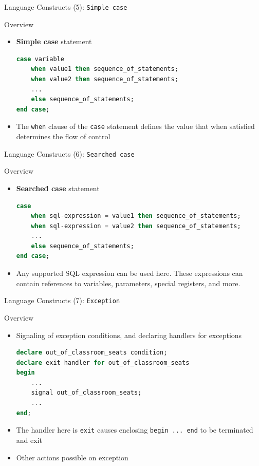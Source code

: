 \documentclass[aspectratio=169, xcolor=dvipsnames]{beamer}
\begin{document}
\begin{frame}[fragile]{Language Constructs (5): \texttt{Simple case}}
    \begin{block}{Overview}
        \begin{itemize}[<+->]
            \item \textbf{Simple case} statement
            \begin{lstlisting}[language=SQL]
case variable
    when value1 then sequence_of_statements; 
    when value2 then sequence_of_statements;
    ...
    else sequence_of_statements;
end case;
            \end{lstlisting}
            \item The \texttt{when} clause of the \texttt{case} statement defines the value that when satisfied determines the flow of control
        \end{itemize}
    \end{block}
\end{frame}

\begin{frame}[fragile]{Language Constructs (6): \texttt{Searched case}}
    \begin{block}{Overview}
        \begin{itemize}[<+->]
            \item \textbf{Searched case} statement
            \begin{lstlisting}[language=SQL]
case 
    when sql-expression = value1 then sequence_of_statements; 
    when sql-expression = value2 then sequence_of_statements;
    ...
    else sequence_of_statements;
end case;
            \end{lstlisting}
            \item Any supported SQL expression can be used here. These expressions can contain references to variables, parameters, special registers, and more.
        \end{itemize}
    \end{block}
\end{frame}

\begin{frame}[fragile]{Language Constructs (7): \texttt{Exception}}
    \begin{block}{Overview}
        \begin{itemize}[<+->]
            \item Signaling of exception conditions, and declaring handlers for exceptions
            \begin{lstlisting}[language=SQL, basicstyle=\ttfamily\scriptsize]
declare out_of_classroom_seats condition;
declare exit handler for out_of_classroom_seats 
begin
    ...
    signal out_of_classroom_seats;
    ...
end;
            \end{lstlisting}
            \item The handler here is \texttt{exit} causes enclosing \texttt{begin ... end} to be terminated and exit
            \item Other actions possible on exception
        \end{itemize}
    \end{block}
\end{frame}
\end{document}
